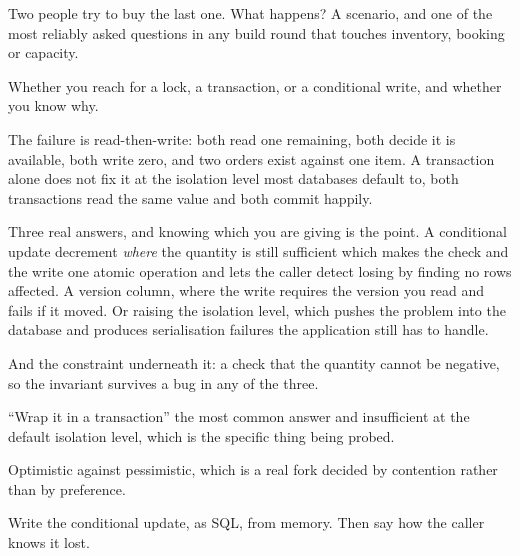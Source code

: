 \begin{bankq}{Two people try to buy the last one. What happens?}
\qasked
A scenario, and one of the most reliably asked questions in any build round
that touches inventory, booking or capacity.

\qtested
Whether you reach for a lock, a transaction, or a conditional write, and
whether you know why.

\qstaff
The failure is read-then-write: both read one remaining, both decide it is
available, both write zero, and two orders exist against one item. A
transaction alone does not fix it \dash{} at the isolation level most databases
default to, both transactions read the same value and both commit happily.

Three real answers, and knowing which you are giving is the point. A
conditional update \dash{} decrement \emph{where} the quantity is still
sufficient \dash{} which makes the check and the write one atomic operation and
lets the caller detect losing by finding no rows affected. A version column,
where the write requires the version you read and fails if it moved. Or raising
the isolation level, which pushes the problem into the database and produces
serialisation failures the application still has to handle.


And the constraint underneath it: a check that the quantity cannot be negative,
so the invariant survives a bug in any of the three.

\qsenior
``Wrap it in a transaction'' \dash{} the most common answer and insufficient at
the default isolation level, which is the specific thing being probed.

\qcontested
Optimistic against pessimistic, which is a real fork decided by contention
rather than by preference.

\qdrill
Write the conditional update, as SQL, from memory. Then say how the caller
knows it lost.
\end{bankq}

